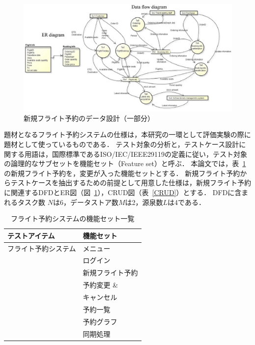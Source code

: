 \documentclass[a4paper,12pt]{jreport}
\begin{document}
\begin{figure}[tb]　%
\begin{center}
\includegraphics[scale=0.68]{dfdanderd.eps}
\end{center}
\caption{新規フライト予約のデータ設計（一部分）}
\label{fig:DFD}
\end{figure}

題材となるフライト予約システムの仕様は，本研究の一環として評価実験の際に題材として使っているものである\cite{Yumo2014}．
テスト対象の分析と，テストケース設計に関する用語は，国際標準であるISO/IEC/IEEE29119の定義に従い，テスト対象の論理的なサブセットを機能セット（Feature set）と呼ぶ\cite{29119}．%
本論文では，表~\ref{Featurelist}の新規フライト予約を，変更が入った機能セットとする．
新規フライト予約からテストケースを抽出するための前提として用意した仕様は，新規フライト予約に関連するDFDとER図（図~\ref{fig:DFD}），CRUD図（表~\ref{CRUD}）とする．
DFDに含まれるタスク数 $N$は6，データストア数$M$は2，源泉数$L$は4である．

\begin{table}[t]
\caption{フライト予約システムの機能セット一覧}
\label{Featurelist}
\begin{center}
\begin{tabular}{l|l}
\hline
テストアイテム&機能セット
\\
\hline\hline
フライト予約システム&メニュー\\
\cline{2-2}
&ログイン\\
\cline{2-2}
&新規フライト予約\\
\cline{2-2}
&予約変更 \&\\
&キャンセル\\
\cline{2-2}
&予約一覧\\
\cline{2-2}
&予約グラフ\\
\cline{2-2}
&同期処理\\
\hline
\end{tabular}
\end{center}
\end{table}
\end{document}

